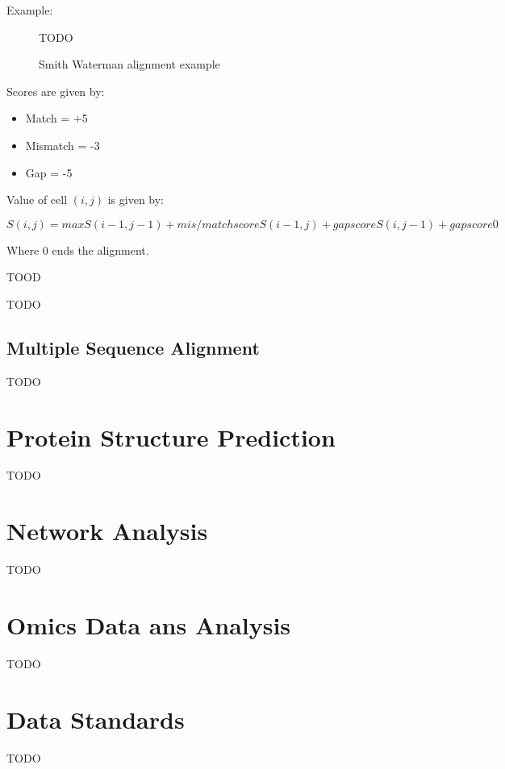 \documentclass[a4paper]{article}
\begin{document}
Example:

\begin{figure}[h!]
  \centering
  TODO
  \caption{Smith Waterman alignment example}
  \label{fig:sw_alignment_eg}
\end{figure}
\FloatBarrier

Scores are given by:

\begin{itemize}
  \item Match = +5
  \item Mismatch = -3
  \item Gap = -5
\end{itemize}

Value of cell $(i, j)$ is given by:

\[
  S(i, j) = max {
    S(i-1, j-1) + mis/match score
    S(i-1, j) + gap score
    S(i, j-1) + gap score
    0
  }
\]

Where 0 ends the alignment.


TOOD


TODO

\subsection{Multiple Sequence Alignment}

TODO

\section{Protein Structure Prediction}

TODO

\section{Network Analysis}

TODO

\section{Omics Data ans Analysis}

TODO

\section{Data Standards}

TODO
\end{document}
